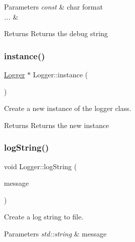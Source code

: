 \begin{DoxyParams}{Parameters}
{\em const} & char format \\
\hline
{\em ...} & \\
\hline
\end{DoxyParams}
\begin{DoxyReturn}{Returns}
Returns the debug string 
\end{DoxyReturn}
\mbox{\label{class_logger_a9f9acae64a5f26267526d16196ea23c8}} 
\subsubsection{\texorpdfstring{instance()}{instance()}}
{\footnotesize\ttfamily \hyperlink{class_logger}{Logger} $\ast$ Logger\+::instance (\begin{DoxyParamCaption}{ }\end{DoxyParamCaption})\hspace{0.3cm}{\ttfamily [static]}}



Create a new instance of the logger class. 

\begin{DoxyReturn}{Returns}
Returns the new instance 
\end{DoxyReturn}
\mbox{\label{class_logger_a60a7e18908cf2d21da346388cadba499}} 
\subsubsection{\texorpdfstring{log\+String()}{logString()}}
{\footnotesize\ttfamily void Logger\+::log\+String (\begin{DoxyParamCaption}\item[{std\+::string}]{message }\end{DoxyParamCaption})\hspace{0.3cm}{\ttfamily [static]}}



Create a log string to file. 


\begin{DoxyParams}{Parameters}
{\em std\+::string} & message \\
\hline
\end{DoxyParams}
\mbox{\label{class_logger_ab1aa3d366ab83a45cc2948681922c402}} 
